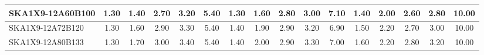 \begin{table}[H]
{{\begin{tabular}{|lccccc||ccccc||ccccc|}
SKA1X9-12A60B100 & 1.30 \cellcolor{blue!18.00} & 1.40 \cellcolor{red!18.00} & 2.70 \cellcolor{green!34.80} & 3.20 \cellcolor{orange!39.00} & 5.40 \cellcolor{purple!46.00} & 1.30 \cellcolor{blue!18.00} & 1.60 \cellcolor{red!25.00} & 2.80 \cellcolor{green!39.00} & 3.00 \cellcolor{orange!28.50} & 7.10 \cellcolor{purple!60.00} & 1.40 \cellcolor{blue!28.50} & 2.00 \cellcolor{red!39.00} & 2.60 \cellcolor{green!32.00} & 2.80 \cellcolor{orange!32.00} & 10.00 \cellcolor{purple!60.00}\\ \hline 
SKA1X9-12A72B120 & 1.30 \cellcolor{blue!18.00} & 1.60 \cellcolor{red!32.00} & 2.90 \cellcolor{green!51.60} & 3.30 \cellcolor{orange!49.50} & 5.40 \cellcolor{purple!46.00} & 1.40 \cellcolor{blue!28.50} & 1.90 \cellcolor{red!46.00} & 2.90 \cellcolor{green!60.00} & 3.20 \cellcolor{orange!49.50} & 6.90 \cellcolor{purple!43.20} & 1.50 \cellcolor{blue!39.00} & 2.20 \cellcolor{red!60.00} & 2.70 \cellcolor{green!46.00} & 3.00 \cellcolor{orange!46.00} & 10.00 \cellcolor{purple!60.00}\\ \hline 
SKA1X9-12A80B133 & 1.30 \cellcolor{blue!18.00} & 1.70 \cellcolor{red!39.00} & 3.00 \cellcolor{green!60.00} & 3.40 \cellcolor{orange!60.00} & 5.40 \cellcolor{purple!46.00} & 1.40 \cellcolor{blue!28.50} & 2.00 \cellcolor{red!53.00} & 2.90 \cellcolor{green!60.00} & 3.30 \cellcolor{orange!60.00} & 7.00 \cellcolor{purple!51.60} & 1.60 \cellcolor{blue!49.50} & 2.20 \cellcolor{red!60.00} & 2.80 \cellcolor{green!60.00} & 3.20 \cellcolor{orange!60.00} & 10.00 \cellcolor{purple!60.00}\\ \hline 
\end{tabular}}
\vspace{-0.300000cm}
\hspace{1cm} 
}
\end{table}

